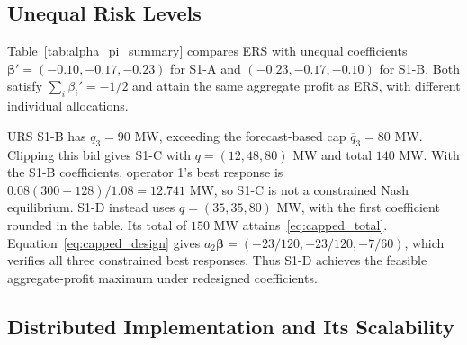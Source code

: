 \documentclass[journal]{IEEEtran}
\begin{document}
\subsection{Unequal Risk Levels}

Table~\ref{tab:alpha_pi_summary} compares ERS with unequal coefficients $\boldsymbol{\beta}'=(-0.10,-0.17,-0.23)$ for S1-A and $(-0.23,-0.17,-0.10)$ for S1-B. Both satisfy $\sum_i\beta_i'=-1/2$ and attain the same aggregate profit as ERS, with different individual allocations.

\begin{table}[hbt!]
\centering
\caption{Unequal Risk Levels: Scenario 1 \\ ($n=3$, $x^o=(120,100,80)$\,MW)}
\label{tab:alpha_pi_summary}
\end{table}

URS S1-B has $q_3=90$ MW, exceeding the forecast-based cap $\overline q_3=80$ MW. Clipping this bid gives S1-C with $q=(12,48,80)$ MW and total $140$ MW. With the S1-B coefficients, operator 1's best response is $0.08(300-128)/1.08=12.741$ MW, so S1-C is not a constrained Nash equilibrium. S1-D instead uses $q=(35,35,80)$ MW, with the first coefficient rounded in the table. Its total of $150$ MW attains~\eqref{eq:capped_total}. Equation~\eqref{eq:capped_design} gives $a_2\boldsymbol{\beta}=(-23/120,-23/120,-7/60)$, which verifies all three constrained best responses. Thus S1-D achieves the feasible aggregate-profit maximum under redesigned coefficients.

\subsection{Distributed Implementation and Its Scalability}
\end{document}

